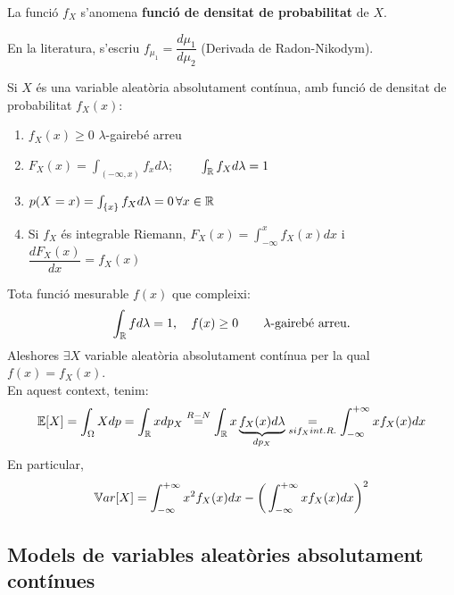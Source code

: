 \begin{defi}
  La funció $f_{X}$ s'anomena \textbf{funció de densitat de probabilitat} de $X$.
\end{defi}

\begin{obs}
  En la literatura, s'escriu $f_{\mu_{1}}=\dfrac{d\mu_{1}}{d\mu_{2}}$ (Derivada de Radon-Nikodym).
\end{obs}

\newpage

\begin{prop}
  Si $X$ és una variable aleatòria absolutament contínua, amb funció de densitat de probabilitat $f_{X}(x)$:
  \begin{enumerate}
      \item $f_{X}(x)\geq0$ $\lambda$-gairebé arreu
      \item $F_{X}(x)=\int_{(-\infty,x)}f_{x}d\lambda$; $\qquad \int_{\mathbb{R}}f_{X}d\lambda=1$
      \item $p(X=x)=\int_{\left\{x\right\}}f_{X}d\lambda=0 \, \forall x \in \mathbb{R}$
      \item Si $f_{X}$ és integrable Riemann, $F_{X}(x)=\int_{-\infty}^{x}f_{X}(x)dx$ i $\dfrac{dF_{X}(x)}{dx}=f_{X}(x)$
  \end{enumerate}
\end{prop}

\begin{obs}
  Tota funció mesurable $f(x)$ que compleixi: 
  \[
    \int_{\mathbb{R}}fd\lambda=1, \quad f(x)\geq 0 \qquad \lambda \text{-gairebé arreu.}
  \]
  Aleshores $\exists X$ variable aleatòria absolutament contínua per la qual $f(x)=f_{X}(x)$. \\
  En aquest context, tenim:
  \[
    \mathbb{E}[X]= \int_{\Omega}Xdp = \int_{\mathbb{R}}xdp_{X} \overset{R-N}{=}\int_{\mathbb{R}}x\underbrace{f_{X}(x)d\lambda}_{dp_{X}} \underset{si f_{X} int. R.}{=} \int_{-\infty}^{+\infty}xf_{X}(x)dx
  \]
  En particular,
  \[
    \mathbb{V} ar[X] = \int_{-\infty}^{+\infty}x^{2}f_{X}(x)dx - \bigg( \int_{-\infty}^{+\infty}xf_{X}(x)dx \bigg)^{2}
  \]
\end{obs}

\subsection{Models de variables aleatòries absolutament contínues}

